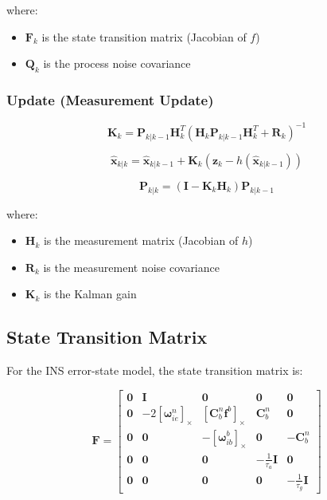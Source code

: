 \documentclass[12pt,a4paper]{article}
\begin{document}
where:
\begin{itemize}
    \item $\mathbf{F}_k$ is the state transition matrix (Jacobian of $f$)
    \item $\mathbf{Q}_k$ is the process noise covariance
\end{itemize}

\subsubsection{Update (Measurement Update)}

\begin{equation}
\mathbf{K}_k = \mathbf{P}_{k|k-1} \mathbf{H}_k^T (\mathbf{H}_k \mathbf{P}_{k|k-1} \mathbf{H}_k^T + \mathbf{R}_k)^{-1}
\end{equation}

\begin{equation}
\hat{\mathbf{x}}_{k|k} = \hat{\mathbf{x}}_{k|k-1} + \mathbf{K}_k (\mathbf{z}_k - h(\hat{\mathbf{x}}_{k|k-1}))
\end{equation}

\begin{equation}
\mathbf{P}_{k|k} = (\mathbf{I} - \mathbf{K}_k \mathbf{H}_k) \mathbf{P}_{k|k-1}
\end{equation}

where:
\begin{itemize}
    \item $\mathbf{H}_k$ is the measurement matrix (Jacobian of $h$)
    \item $\mathbf{R}_k$ is the measurement noise covariance
    \item $\mathbf{K}_k$ is the Kalman gain
\end{itemize}

\subsection{State Transition Matrix}

For the INS error-state model, the state transition matrix is:

\begin{equation}
\mathbf{F} = \begin{bmatrix}
\mathbf{0} & \mathbf{I} & \mathbf{0} & \mathbf{0} & \mathbf{0} \\
\mathbf{0} & -2[\boldsymbol{\omega}_{ie}^n]_\times & [\mathbf{C}_b^n\mathbf{f}^b]_\times & \mathbf{C}_b^n & \mathbf{0} \\
\mathbf{0} & \mathbf{0} & -[\boldsymbol{\omega}_{ib}^b]_\times & \mathbf{0} & -\mathbf{C}_b^n \\
\mathbf{0} & \mathbf{0} & \mathbf{0} & -\frac{1}{\tau_a}\mathbf{I} & \mathbf{0} \\
\mathbf{0} & \mathbf{0} & \mathbf{0} & \mathbf{0} & -\frac{1}{\tau_g}\mathbf{I}
\end{bmatrix}
\end{equation}
\end{document}
